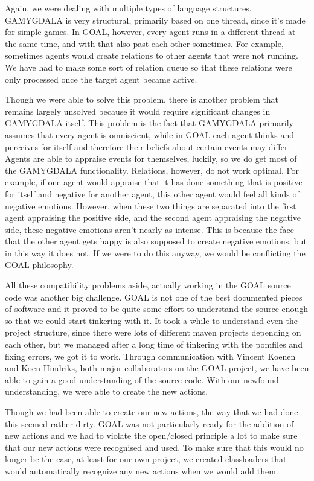 Again, we were dealing with multiple types of language structures. GAMYGDALA is very structural, primarily based on one thread, since it's made for simple games. In GOAL, however, every agent runs in a different thread at the same time, and with that also past each other sometimes. For example, sometimes agents would create relations to other agents that were not running. We have had to make some sort of relation queue so that these relations were only processed once the target agent became active.

Though we were able to solve this problem, there is another problem that remains largely unsolved because it would require significant changes in GAMYGDALA itself. This problem is the fact that GAMYGDALA primarily assumes that every agent is omniscient, while in GOAL each agent thinks and perceives for itself and therefore their beliefs about certain events may differ. Agents are able to appraise events for themselves, luckily, so we do get most of the GAMYGDALA functionality. Relations, however, do not work optimal. For example, if one agent would appraise that it has done something that is positive for itself and negative for another agent, this other agent would feel all kinds of negative emotions. However, when these two things are separated into the first agent appraising the positive side, and the second agent appraising the negative side, these negative emotions aren't nearly as intense. This is because the face that the other agent gets happy is also supposed to create negative emotions, but in this way it does not. If we were to do this anyway, we would be conflicting the GOAL philosophy.

All these compatibility problems aside, actually working in the GOAL source code was another big challenge. GOAL is not one of the best documented pieces of software and it proved to be quite some effort to understand the source enough so that we could start tinkering with it. It took a while to understand even the project structure, since there were lots of different maven projects depending on each other, but we managed after a long time of tinkering with the pomfiles and fixing errors, we got it to work. Through communication with Vincent Koenen and Koen Hindriks, both major collaborators on the GOAL project, we have been able to gain a good understanding of the source code. With our newfound understanding, we were able to create the new actions.

Though we had been able to create our new actions, the way that we had done this seemed rather dirty. GOAL was not particularly ready for the addition of new actions and we had to violate the open/closed principle a lot to make sure that our new actions were recognised and used. To make sure that this would no longer be the case, at least for our own project, we created classloaders that would automatically recognize any new actions when we would add them.

